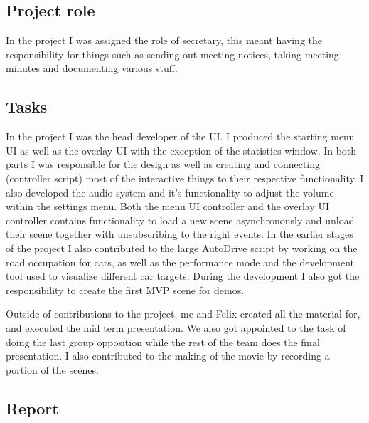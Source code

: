 \subsection{Project role}
In the project I was assigned the role of secretary, this meant having the responsibility for things such as sending out meeting notices, taking meeting minutes and documenting various stuff.

\subsection{Tasks}
In the project I was the head developer of the UI. I produced the starting menu UI as well as the overlay UI with the exception of the statistics window. In both parts I was responsible for the design as well as creating and connecting (controller script) most of the interactive things to their respective functionality. I also developed the audio system and it's functionality to adjust the volume within the settings menu. Both the menu UI controller and the overlay UI controller contains functionality to load a new scene asynchronously and unload their scene together with unsubscribing to the right events. In the earlier stages of the project I also contributed to the large AutoDrive script by working on the road occupation for cars, as well as the performance mode and the development tool used to visualize different car targets. During the development I also got the responsibility to create the first MVP scene for demos.

Outside of contributions to the project, me and Felix created all the material for, and executed the mid term presentation. We also got appointed to the task of doing the last group opposition while the rest of the team does the final presentation. I also contributed to the making of the movie by recording a portion of the scenes.

\subsection{Report}
    
